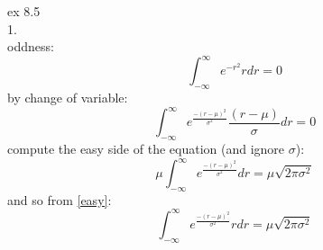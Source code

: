 \documentclass[20pt]{extarticle}
\begin{document}
ex 8.5\\ 
1.\\
oddness:\\
\begin{equation}
\int_{-\infty}^{\infty}e^{-r^2}rdr = 0
\end{equation}
by change of variable:\\
\begin{equation}
\int_{-\infty}^{\infty}e^{\frac{-(r-\mu)^2}{\sigma^2}}\frac{(r-\mu)}{\sigma}dr = 0
\end{equation} 
compute the easy side of the equation (and ignore $\sigma$):\\
\begin{equation}\label{easy}
\mu\int_{-\infty}^{\infty}e^{\frac{-(r-\mu)^2}{\sigma^2}}dr = \mu\sqrt{2\pi\sigma^2}
\end{equation}
and so from \ref{easy}:\\
\begin{equation}
\int_{-\infty}^{\infty}e^{\frac{-(r-\mu)^2}{\sigma^2}}rdr = \mu\sqrt{2\pi\sigma^2}
\end{equation} 
\end{document}
